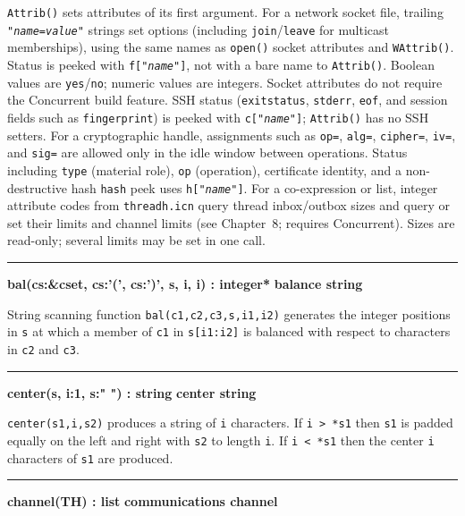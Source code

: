 \noindent
\texttt{Attrib()} sets attributes of its first argument.
For a network socket file, trailing \texttt{"\textit{name}=\textit{value}"}
strings set options (including \texttt{join}/\texttt{leave} for multicast
memberships), using the same names as \texttt{open()} socket attributes
and \texttt{WAttrib()}. Status is peeked with \texttt{f["\textit{name}"]},
not with a bare name to \texttt{Attrib()}.
Boolean values are \texttt{yes}/\texttt{no}; numeric values are
integers. Socket attributes do not require the Concurrent build
feature.
SSH status (\texttt{exitstatus}, \texttt{stderr}, \texttt{eof}, and
session fields such as \texttt{fingerprint}) is peeked with
\texttt{c["\textit{name}"]}; \texttt{Attrib()} has no SSH setters.
For a cryptographic handle, assignments such as \texttt{op=}, \texttt{alg=},
\texttt{cipher=}, \texttt{iv=}, and \texttt{sig=} are allowed only in
the idle window between operations. Status including \texttt{type}
(material role), \texttt{op} (operation), certificate identity, and a
non-destructive hash \texttt{hash} peek uses \texttt{h["\textit{name}"]}.
For a co-expression or list, integer attribute codes from
\texttt{threadh.icn} query thread inbox/outbox sizes and query or set
their limits and channel limits (see Chapter~8; requires Concurrent).
Sizes are read-only; several limits may be set in one call.

\bigskip
\hrule\vspace{0.1cm}
\noindent
{\bf bal(cs:\&cset, cs:'(', cs:')', s, i, i) : integer* } \hfill {\bf balance string}

\noindent
{}String scanning function
\texttt{bal(c1,c2,c3,s,i1,i2)} generates the integer positions in
\texttt{s} at which a member of \texttt{c1} in \texttt{s[i1:i2]} is
balanced with respect to characters in \texttt{c2} and \texttt{c3}.

\bigskip
\hrule\vspace{0.1cm}
\noindent
{\bf center(s, i:1, s:" ") : string } \hfill {\bf center string}

\noindent
{}\texttt{center(s1,i,s2)} produces a
string of \texttt{i} characters. If \texttt{i {\textgreater} *s1} then
\texttt{s1} is padded equally on the left and right with \texttt{s2} to
length \texttt{i}. If \texttt{i {\textless} *s1} then the center
\texttt{i} characters of \texttt{s1} are produced.

\bigskip
\hrule\vspace{0.1cm}
\noindent
{\bf channel(TH) : list } \hfill {\bf communications channel}

